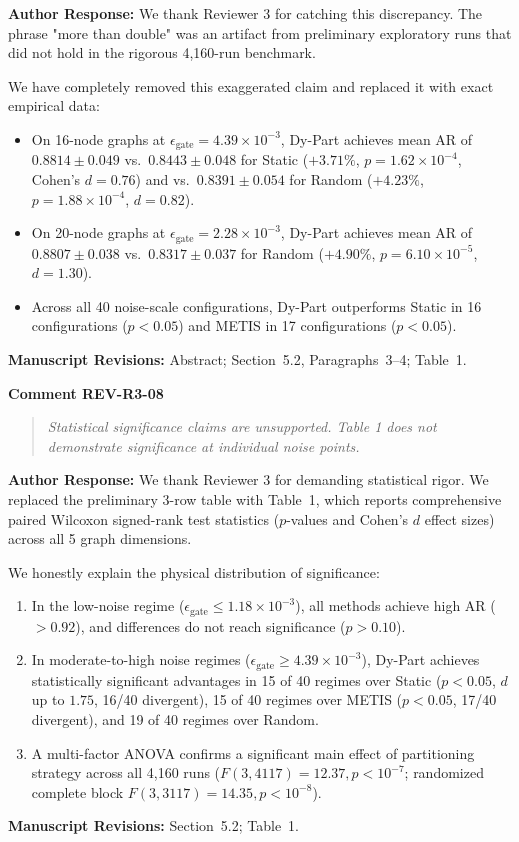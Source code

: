 \documentclass[11pt,a4paper]{article}
\newcommand{\commentbox}[2]{
    \vspace{0.8em}
    \noindent\textbf{\textcolor{commentcolor}{#1}}
    \vspace{0.2em}
    \begin{quote}
        \small\itshape #2
    \end{quote}
}
\newcommand{\responsebox}[1]{
    \noindent\textbf{\textcolor{responsecolor}{Author Response:}} #1
    \vspace{0.8em}
}
\begin{document}
\responsebox{We thank Reviewer 3 for catching this discrepancy. The phrase "more than double" was an artifact from preliminary exploratory runs that did not hold in the rigorous 4,160-run benchmark.

We have completely removed this exaggerated claim and replaced it with exact empirical data:
\begin{itemize}[noitemsep]
    \item On 16-node graphs at $\epsilon_{\text{gate}} = 4.39 \times 10^{-3}$, Dy-Part achieves mean AR of $0.8814 \pm 0.049$ vs.\ $0.8443 \pm 0.048$ for Static ($+3.71\%$, $p = 1.62 \times 10^{-4}$, Cohen's $d = 0.76$) and vs.\ $0.8391 \pm 0.054$ for Random ($+4.23\%$, $p = 1.88 \times 10^{-4}$, $d = 0.82$).
    \item On 20-node graphs at $\epsilon_{\text{gate}} = 2.28 \times 10^{-3}$, Dy-Part achieves mean AR of $0.8807 \pm 0.038$ vs.\ $0.8317 \pm 0.037$ for Random ($+4.90\%$, $p = 6.10 \times 10^{-5}$, $d = 1.30$).
    \item Across all 40 noise-scale configurations, Dy-Part outperforms Static in 16 configurations ($p < 0.05$) and METIS in 17 configurations ($p < 0.05$).
\end{itemize}
\textbf{Manuscript Revisions:} Abstract; Section~5.2, Paragraphs~3--4; Table~1.}

\commentbox{Comment REV-R3-08}{Statistical significance claims are unsupported. Table 1 does not demonstrate significance at individual noise points.}

\responsebox{We thank Reviewer 3 for demanding statistical rigor. We replaced the preliminary 3-row table with Table~1, which reports comprehensive paired Wilcoxon signed-rank test statistics ($p$-values and Cohen's $d$ effect sizes) across all 5 graph dimensions.

We honestly explain the physical distribution of significance:
\begin{enumerate}[noitemsep]
    \item In the low-noise regime ($\epsilon_{\text{gate}} \le 1.18 \times 10^{-3}$), all methods achieve high AR ($>0.92$), and differences do not reach significance ($p > 0.10$).
    \item In moderate-to-high noise regimes ($\epsilon_{\text{gate}} \ge 4.39 \times 10^{-3}$), Dy-Part achieves statistically significant advantages in 15 of 40 regimes over Static ($p < 0.05$, $d$ up to $1.75$, 16/40 divergent), 15 of 40 regimes over METIS ($p < 0.05$, 17/40 divergent), and 19 of 40 regimes over Random.
    \item A multi-factor ANOVA confirms a significant main effect of partitioning strategy across all 4,160 runs ($F(3, 4117) = 12.37, p < 10^{-7}$; randomized complete block $F(3, 3117) = 14.35, p < 10^{-8}$).
\end{enumerate}
\textbf{Manuscript Revisions:} Section~5.2; Table~1.}
\end{document}
